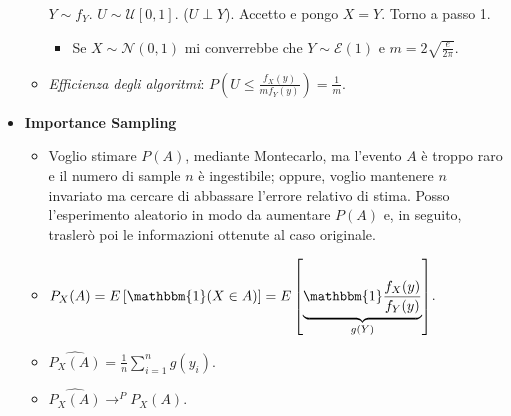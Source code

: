 \documentclass[8pt]{extarticle}
\begin{document}
\begin{multicols*}{3}
\begin{itemize}
\begin{itemize}
\begin{algorithmic}[1]
                            \State $Y\sim f_{Y}$.
                            \State $U\sim\mathcal{U}[0,1]$. ($U\perp Y$).
                            \State Accetto e pongo $X=Y$.
                            \Else
                            \State Torno a passo 1.
                            \EndIf
                        \end{algorithmic}
                        \begin{itemize}
                            \item Se $X\sim\mathcal{N}(0,1)$ mi converrebbe che $Y\sim\mathcal{E}(1)$ e $m=2\sqrt{\frac{e}{2\pi}}$.
                        \end{itemize}
                  \item \textit{Efficienza degli algoritmi}: $P\left(U\leq \frac{f_{X}(y)}{mf_{Y}(y)}\right)=\frac{1}{m}$.
              \end{itemize}
        \item \textbf{Importance Sampling}
              \begin{itemize}
                  \item Voglio stimare $P(A)$, mediante Montecarlo, ma l'evento $A$ è troppo raro e il numero di sample $n$ è ingestibile; oppure, voglio mantenere $n$ invariato ma cercare di abbassare l'errore relativo di stima. Posso l'esperimento aleatorio in modo da aumentare $P(A)$ e, in seguito, traslerò poi le informazioni ottenute al caso originale.
                  \item $P_{X}(A)=E\left[\mathbbm{1}(X\in A)\right]=E\left[\underbrace{\mathbbm{1}\frac{f_{X}(y)}{f_{Y}(y)}}_{g(Y)}\right]$.
                  \item $\hat{P_{X}(A)}=\frac{1}{n}\sum_{i=1}^{n}g(y_{i})$.
                  \item $\hat{P_{X}(A)}\rightarrow^{P} P_{X}(A)$.
              \end{itemize}
    \end{itemize}


\end{multicols*}
\end{document}
